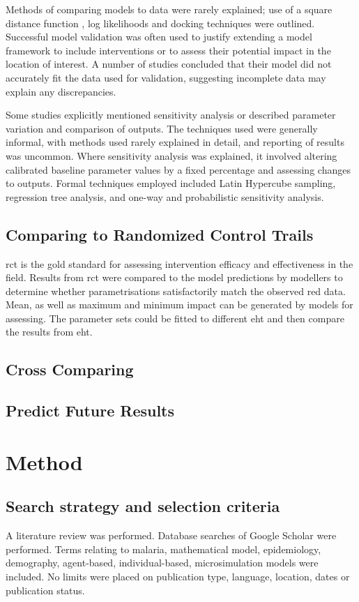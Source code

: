 \documentclass[a4paper, 12pt, twoside]{article}
\begin{document}
Methods of comparing models to data were rarely explained; use of a square distance function , log likelihoods and docking techniques were outlined.
Successful model validation was often used to justify extending a model framework to include interventions or to assess their potential impact in the location of interest.
A number of studies concluded that their model did not accurately fit the data used for validation, suggesting incomplete data may explain any discrepancies.

Some studies explicitly mentioned sensitivity analysis or described parameter variation and comparison of outputs.
The techniques used were generally informal, with methods used rarely explained in detail, and reporting of results was uncommon.
Where sensitivity analysis was explained, it involved altering calibrated baseline parameter values by a fixed percentage and assessing changes to outputs.
Formal techniques employed included Latin Hypercube sampling, regression tree analysis, and one-way and probabilistic sensitivity analysis.

\subsection{Comparing to Randomized Control Trails}

\gls{rct} is the gold standard for assessing intervention efficacy and effectiveness in the field.
Results from \gls{rct} were compared to the model predictions by modellers to determine whether parametrisations satisfactorily match the observed red data\cite{Sherrard-Smith2018b}.
Mean, as well as maximum and minimum impact can be generated by models for assessing.
The parameter sets could be fitted to different \gls{eht} and then compare the results from \gls{eht}.

\subsection{Cross Comparing}
\subsection{Predict Future Results}

\section{Method}%
\label{sec:method}
\subsection{Search strategy and selection criteria}
A literature review was performed.
Database searches of Google Scholar were performed.
Terms relating to malaria, mathematical model, epidemiology, demography, agent-based, individual-based, microsimulation models were included. No limits were placed on publication type, language, location, dates or publication status.
\end{document}
